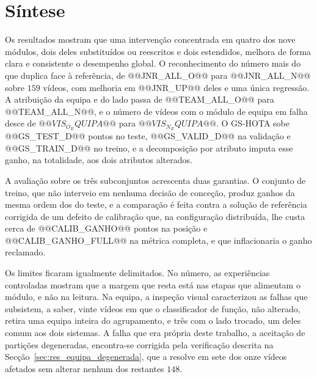 \section{Síntese}\label{sec:res_sintese}

Os resultados mostram que uma intervenção concentrada em quatro dos nove módulos, dois deles
substituídos ou reescritos e dois estendidos, melhora de forma clara e consistente o desempenho
global. O reconhecimento do número mais do que duplica face à referência, de @@JNR_ALL_O@@ para
@@JNR_ALL_N@@ sobre $159$ vídeos, com melhoria em @@JNR_UP@@ deles e uma única regressão. A
atribuição da equipa e do lado passa de @@TEAM_ALL_O@@ para @@TEAM_ALL_N@@, e o número de vídeos
com o módulo de equipa em falha desce de $@@VIS_O_EQUIPA@@$ para $@@VIS_N_EQUIPA@@$. O GS-HOTA sobe
@@GS_TEST_D@@ pontos no teste, @@GS_VALID_D@@ na validação e @@GS_TRAIN_D@@ no treino, e a
decomposição por atributo imputa esse ganho, na totalidade, aos dois atributos alterados.

A avaliação sobre os três subconjuntos acrescenta duas garantias. O conjunto de treino, que não
interveio em nenhuma decisão de conceção, produz ganhos da mesma ordem dos do teste, e a
comparação é feita contra a solução de referência corrigida de um defeito de calibração que, na
configuração distribuída, lhe custa cerca de @@CALIB_GANHO@@ pontos na posição e @@CALIB_GANHO_FULL@@
na métrica completa, e que inflacionaria o ganho reclamado.

Os limites ficaram igualmente delimitados. No número, as experiências controladas mostram que a
margem que resta está nas etapas que alimentam o módulo, e não na leitura. Na equipa, a inspeção
visual caracterizou as falhas que subsistem, a saber, vinte vídeos em que o classificador de função, não
alterado, retira uma equipa inteira do agrupamento, e três com o lado trocado, um deles comum aos
dois sistemas. A falha que era própria deste trabalho, a aceitação de partições degeneradas,
encontra-se corrigida pela verificação descrita na Secção~\ref{sec:res_equipa_degenerada}, que a
resolve em sete dos onze vídeos afetados sem alterar nenhum dos restantes $148$.

